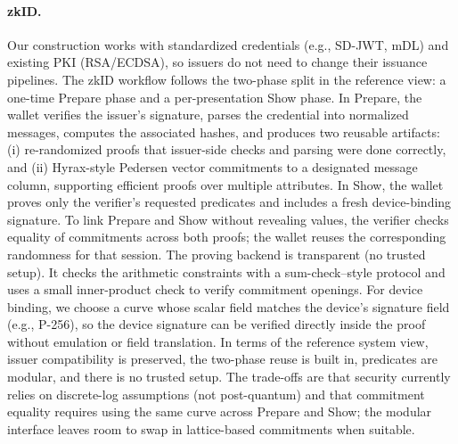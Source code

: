\paragraph{zkID.}
Our construction works with standardized credentials (e.g., SD-JWT, mDL) and existing PKI (RSA/ECDSA), so issuers do not need to change their issuance pipelines.
The zkID workflow follows the two-phase split in the reference view: a one-time Prepare phase and a per-presentation Show phase.
In Prepare, the wallet verifies the issuer’s signature, parses the credential into normalized messages, computes the associated hashes, and produces two reusable artifacts: (i) re-randomized proofs that issuer-side checks and parsing were done correctly, and (ii) Hyrax-style Pedersen vector commitments to a designated message column, supporting efficient proofs over multiple attributes.
In Show, the wallet proves only the verifier’s requested predicates and includes a fresh device-binding signature. To link Prepare and Show without revealing values, the verifier checks equality of commitments across both proofs; the wallet reuses the corresponding randomness for that session.
The proving backend is transparent (no trusted setup). It checks the arithmetic constraints with a sum-check–style protocol and uses a small inner-product check to verify commitment openings. For device binding, we choose a curve whose scalar field matches the device’s signature field (e.g., P-256), so the device signature can be verified directly inside the proof without emulation or field translation. 
In terms of the reference system view, issuer compatibility is preserved, the two-phase reuse is built in, predicates are modular, and there is no trusted setup. The trade-offs are that security currently relies on discrete-log assumptions (not post-quantum) and that commitment equality requires using the same curve across Prepare and Show; the modular interface leaves room to swap in lattice-based commitments when suitable.

